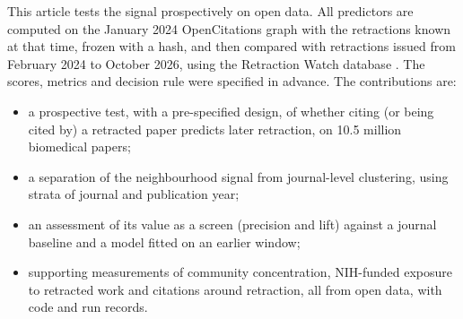 This article tests the signal prospectively on open data. All predictors are computed on the January 2024
OpenCitations graph \citep{arjomandi2024dataset} with the retractions known at that time, frozen with a hash, and then
compared with retractions issued from February 2024 to October 2026, using the Retraction Watch database
\citep{rittman2025rw}. The scores, metrics and decision rule were specified in advance. The contributions are:
\begin{itemize}
\item a prospective test, with a pre-specified design, of whether citing (or being cited by) a retracted paper predicts later
retraction, on 10.5 million biomedical papers;
\item a separation of the neighbourhood signal from journal-level clustering, using strata of journal and publication
year;
\item an assessment of its value as a screen (precision and lift) against a journal baseline and a model fitted on an
earlier window;
\item supporting measurements of community concentration, NIH-funded exposure to retracted work and citations around
retraction, all from open data, with code and run records.
\end{itemize}
